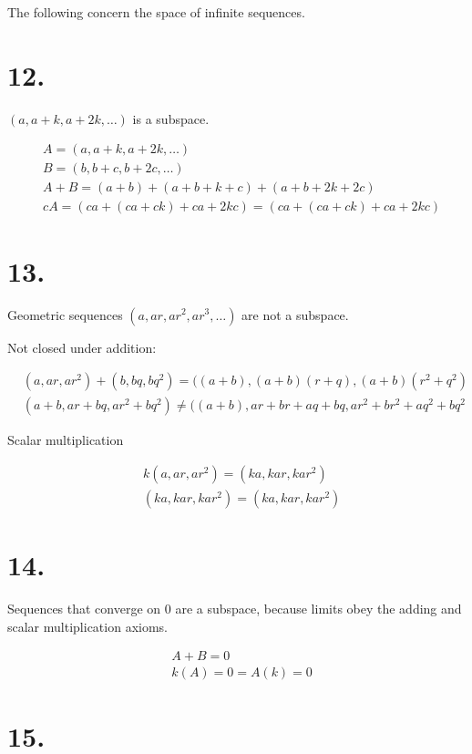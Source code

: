 \documentclass[]{article}
\begin{document}
The following concern the space of infinite sequences.

\hypertarget{section-11}{%
\section{12.}\label{section-11}}

\((a, a+k, a+2k,\dots)\) is a subspace.

\[\begin{aligned}&A =(a, a+k, a+2k,\dots)\\
& B= (b, b+c, b+2c,\dots)\\
&A+B=(a+b)+(a+b+k+c) +(a+b+2k+2c)\\
&cA=(ca+(ca+ck)+ca+2kc)=(ca+(ca+ck)+ca+2kc)\end{aligned}\]

\hypertarget{section-12}{%
\section{13.}\label{section-12}}

Geometric sequences \((a, ar, ar^2, ar^3,\dots)\) are not a subspace.

Not closed under addition:

\[\begin{aligned}
&(a,ar,ar^2)+(b, bq, bq^2)=((a+b), (a+b)(r+q), (a+b)(r^2+q^2)\\
&(a+b, ar+bq, ar^2+bq^2) \neq((a+b), ar+br+aq+bq, ar^2+br^2+aq^2+bq^2
\end{aligned}\]

Scalar multiplication

\[\begin{aligned}&k(a, ar, ar^2)=(ka, kar, kar^2)\\
&(ka, kar, kar^2)=(ka, kar, kar^2)\end{aligned}\]

\hypertarget{section-13}{%
\section{14.}\label{section-13}}

Sequences that converge on 0 are a subspace, because limits obey the
adding and scalar multiplication axioms.

\[\begin{aligned} &A+B=0\\
& k(A)=0=A(k)=0\end{aligned}\]

\hypertarget{section-14}{%
\section{15.}\label{section-14}}
\end{document}
